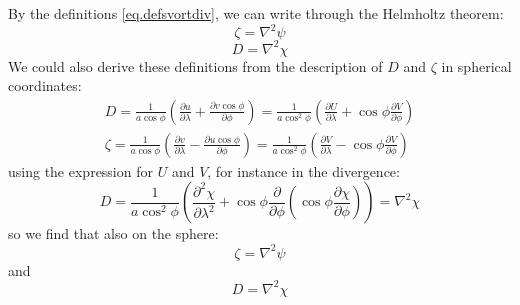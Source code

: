 By the definitions \ref{eq.defsvortdiv}, we can write through the Helmholtz theorem:
\begin{equation}\label{eq. vorticity}
	\zeta=\nabla^2\psi
\end{equation}
\begin{equation}\label{eq.divergence}
	D=\nabla^2\chi
\end{equation}
We could also derive these definitions from the description of $D$ and $\zeta$ in spherical coordinates:
\begin{align*}
	D=\frac{1}{a\cos\phi}\left(\frac{\partial u}{\partial\lambda}+\frac{\partial v\cos\phi}{\partial\phi}\right)=\frac{1}{a\cos^2\phi}\left(\frac{\partial U}{\partial\lambda}+\cos\phi\frac{\partial V}{\partial\phi}\right) \\
	\zeta= \frac{1}{a\cos\phi}\left(\frac{\partial v}{\partial\lambda}-\frac{\partial u\cos\phi}{\partial\phi}\right)=\frac{1}{a\cos^2\phi}\left(\frac{\partial V}{\partial\lambda}-\cos\phi\frac{\partial V}{\partial\phi}\right)
\end{align*}
using the expression for $U$ and $V$, for instance in the divergence:
\begin{equation}\label{eq.finitedivergence}
	D=\frac{1}{a\cos^2\phi}\left(\frac{\partial^2\chi}{\partial\lambda^2}+\cos\phi\frac{\partial}{\partial\phi}\left(\cos\phi\frac{\partial\chi}{\partial\phi}\right)\right)=\nabla^2\chi
\end{equation}
so we find that also on the sphere:
\begin{equation}\label{eq. vorticity}
	\zeta=\nabla^2\psi
\end{equation}
and
\begin{equation}\label{eq.divergence}
	D=\nabla^2\chi
\end{equation}

